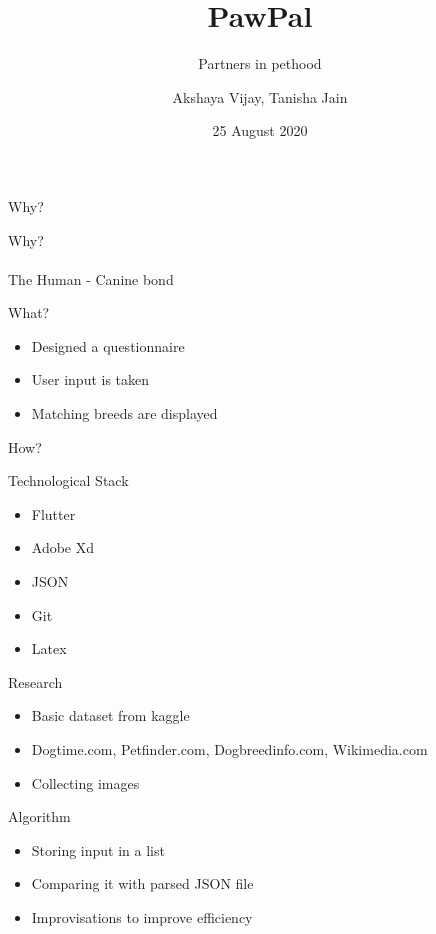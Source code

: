 \documentclass[14pt]{beamer}
\title[Pawpal]{PawPal}
\subtitle[Partners of pethood]{Partners in pethood}
\author[Team 42]{Akshaya Vijay, Tanisha Jain}
\date{25 August 2020}
\begin{document}
\begin{frame}
    \titlepage
\end{frame}


\begin{frame}[standout]
   Why?
\end{frame}

\begin{frame}[standout]
   Why?
   \\ \\\alert{The Human - Canine bond}
\end{frame}

\begin{frame}[standout]
   What?
\end{frame}

\begin{frame}
    \begin{itemize}
        \item Designed a questionnaire 
        \item User input is taken
        \item Matching breeds are displayed
    \end{itemize}
\end{frame}

\begin{frame}[standout]
   How?
\end{frame}

\begin{frame}{Technological Stack}
    \begin{itemize}
        \item Flutter
        \item Adobe Xd
        \item JSON
        \item Git
        \item Latex
    \end{itemize}
\end{frame}

\begin{frame}{Research}
    \begin{itemize}
        \item Basic dataset from kaggle
        \item Dogtime.com, Petfinder.com, Dogbreedinfo.com, Wikimedia.com
        \item Collecting images 
    \end{itemize}
\end{frame}

\begin{frame}{Algorithm}
    \begin{itemize}
        \item Storing input in a list
        \item Comparing it with parsed JSON file
        \item Improvisations to improve efficiency 
    \end{itemize}
\end{frame}
\end{document}

